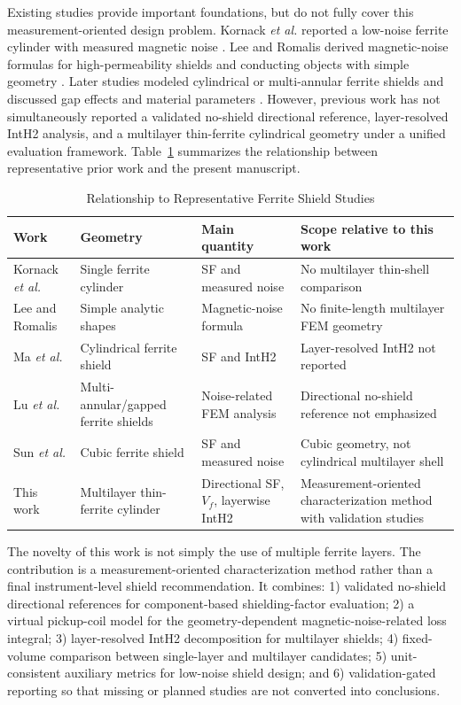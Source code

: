 \documentclass[letterpaper,journal]{IEEEtran}
\begin{document}
Existing studies provide important foundations, but do not fully cover this measurement-oriented design problem. Kornack \textit{et al.} reported a low-noise ferrite cylinder with measured magnetic noise \cite{ref12}. Lee and Romalis derived magnetic-noise formulas for high-permeability shields and conducting objects with simple geometry \cite{ref9}. Later studies modeled cylindrical or multi-annular ferrite shields and discussed gap effects and material parameters \cite{ref13,ref14,ref17}. However, previous work has not simultaneously reported a validated no-shield directional reference, layer-resolved IntH2 analysis, and a multilayer thin-ferrite cylindrical geometry under a unified evaluation framework. Table~\ref{tab:comparison} summarizes the relationship between representative prior work and the present manuscript.

\begin{table}[!t]
\caption{Relationship to Representative Ferrite Shield Studies}
\label{tab:comparison}
\centering
\footnotesize
\setlength{\tabcolsep}{3pt}
\begin{tabular}{p{}p{}p{}p{}}
\toprule
Work & Geometry & Main quantity & Scope relative to this work \\
\midrule
Kornack \textit{et al.} \cite{ref12} & Single ferrite cylinder & SF and measured noise & No multilayer thin-shell comparison \\
Lee and Romalis \cite{ref9} & Simple analytic shapes & Magnetic-noise formula & No finite-length multilayer FEM geometry \\
Ma \textit{et al.} \cite{ref13} & Cylindrical ferrite shield & SF and IntH2 & Layer-resolved IntH2 not reported \\
Lu \textit{et al.} \cite{ref14,ref17} & Multi-annular/gapped ferrite shields & Noise-related FEM analysis & Directional no-shield reference not emphasized \\
Sun \textit{et al.} \cite{ref16} & Cubic ferrite shield & SF and measured noise & Cubic geometry, not cylindrical multilayer shell \\
This work & Multilayer thin-ferrite cylinder & Directional SF, $V_f$, layerwise IntH2 & Measurement-oriented characterization method with validation studies \\
\bottomrule
\end{tabular}
\end{table}

The novelty of this work is not simply the use of multiple ferrite layers. The contribution is a measurement-oriented characterization method rather than a final instrument-level shield recommendation. It combines: 1) validated no-shield directional references for component-based shielding-factor evaluation; 2) a virtual pickup-coil model for the geometry-dependent magnetic-noise-related loss integral; 3) layer-resolved IntH2 decomposition for multilayer shields; 4) fixed-volume comparison between single-layer and multilayer candidates; 5) unit-consistent auxiliary metrics for low-noise shield design; and 6) validation-gated reporting so that missing or planned studies are not converted into conclusions.
\end{document}
